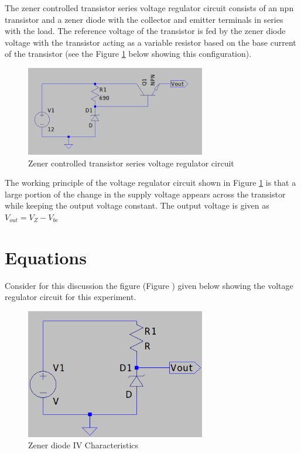 \documentclass[12pt, a4paper]{article}
\begin{document}
		The zener controlled transistor series voltage regulator circuit consists of an npn transistor and a zener diode with the collector and emitter terminals in series with the load. The reference voltage of the transistor is fed by the zener diode voltage with the transistor acting as a variable resistor based on the base current of the transistor (see the Figure \ref{fig:transistor_zener_circuit} below showing this configuration).

		\begin{figure}[H]
			\centering
			\includegraphics[width=0.7\textwidth]{Images/transistor_zener_circuit.png}
			\caption{Zener controlled transistor series voltage regulator circuit}
			\label{fig:transistor_zener_circuit}
		\end{figure}

		The working principle of the voltage regulator circuit shown in Figure \ref{fig:transistor_zener_circuit} is that a large portion of the change in the supply voltage appears across the transistor while keeping the output voltage constant. The output voltage is given as $V_{out} = V_Z - V_{be}$

	\section{Equations} %
	\label{sec:equations}
		Consider for this discussion the figure (Figure ) given below showing the voltage regulator circuit for this experiment.

		\begin{figure}[H]
			\centering
			\includegraphics[width=0.7\textwidth]{Images/Regulator_Circuit.png}
			\caption{Zener diode IV Characteristics}
			\label{fig:regulator_circuit}
		\end{figure}
\end{document}
